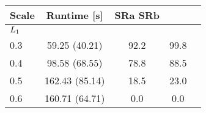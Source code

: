 \begin{tabular}{lcccc}
\toprule
{\bf Scale} & {\bf Runtime [s] } & {\bf SRa} {\bf SRb}\\ 
\midrule
\multicolumn{2}{l}{$ L_1 $} \\ 
 0.3 & 59.25 (40.21) & 92.2  & 99.8  \\
0.4 & 98.58 (68.55) & 78.8  & 88.5  \\
0.5 & 162.43 (85.14) & 18.5  & 23.0  \\
0.6 & 160.71 (64.71) & 0.0  & 0.0  \\
\bottomrule
\end{tabular}
